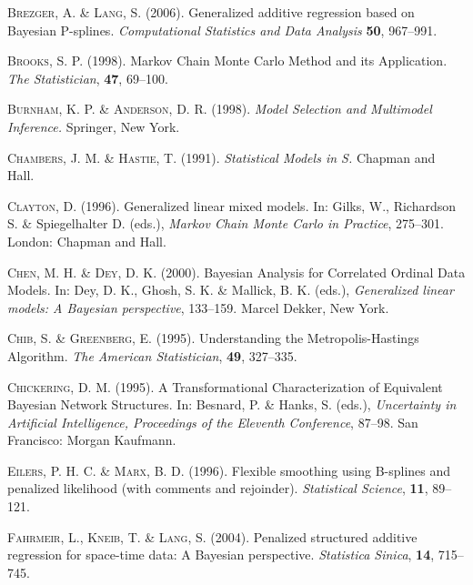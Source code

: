\begin{thebibliography}{99}
 {\scshape Brezger, A. \& Lang, S.} (2006).
 Generalized additive regression based on Bayesian P-splines.
 {\it Computational Statistics and Data Analysis} {\bf 50}, 967--991.

 {\scshape Brooks, S. P.} (1998).
 Markov Chain Monte Carlo Method and its Application.
 {\it The Statistician}, {\bf 47}, 69--100.

 {\scshape Burnham, K. P. \& Anderson, D. R.} (1998).
 {\it Model Selection and Multimodel Inference.}
 Springer, New York.

 {\scshape Chambers, J. M. \& Hastie, T.} (1991).
 {\it Statistical Models in S.}
 Chapman and Hall.

 {\scshape Clayton, D.} (1996).
 Generalized linear mixed models.
 In: Gilks, W., Richardson S. \& Spiegelhalter D. (eds.),
{\it Markov Chain Monte Carlo in Practice}, 275--301.
 London: Chapman and Hall.

 {\scshape Chen, M. H. \& Dey, D. K.} (2000).
 Bayesian Analysis for Correlated Ordinal Data Models.
 In: Dey, D. K., Ghosh, S. K. \& Mallick, B. K. (eds.),
 {\it Generalized linear models: A Bayesian perspective}, 133--159.
 Marcel Dekker, New York.

 {\scshape Chib, S. \& Greenberg, E.} (1995).
 Understanding the Metropolis-Hastings Algorithm.
 {\it The American Statistician}, {\bf 49}, 327--335.

 {\scshape Chickering, D. M.} (1995).
 A Transformational Characterization of Equivalent Bayesian Network Structures.
 In: Besnard, P. \& Hanks, S. (eds.),
 {\it Uncertainty in Artificial Intelligence, Proceedings of the Eleventh Conference},  87--98.
 San Francisco: Morgan Kaufmann.

 {\scshape Eilers, P. H. C. \& Marx, B. D.} (1996).
 Flexible smoothing using B-splines and penalized likelihood (with comments and rejoinder).
 {\it Statistical Science}, {\bf 11}, 89--121.

 {\scshape Fahrmeir, L., Kneib, T. \& Lang, S.} (2004).
 Penalized structured additive regression for space-time data: A Bayesian perspective.
 {\it Statistica Sinica}, {\bf 14}, 715--745.


\end{thebibliography}
